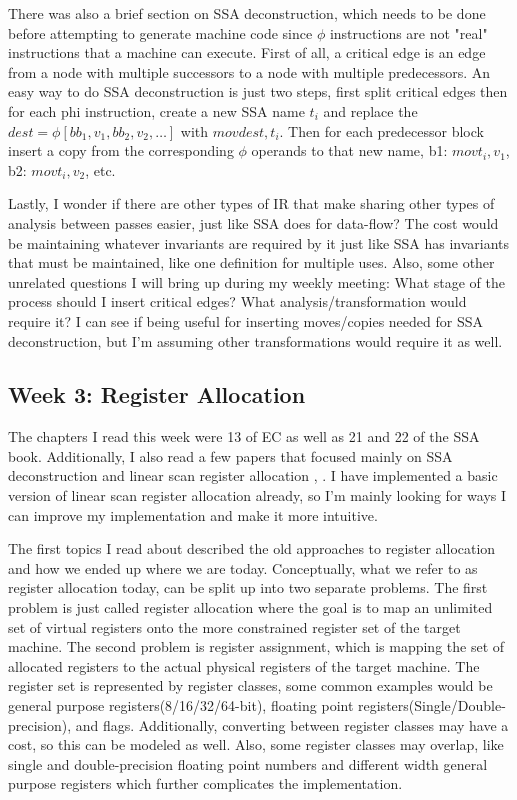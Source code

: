\documentclass[11pt, a4paper, titlepage]{article}
\begin{document}
There was also a brief section on SSA deconstruction, which needs to be done before attempting to generate machine code since $\phi$ instructions are not "real" instructions that a machine can execute.
First of all, a critical edge is an edge from a node with multiple successors to a node with multiple predecessors.
An easy way to do SSA deconstruction is just two steps, first split critical edges then for each phi instruction,
create a new SSA name $t_{i}$ and replace the $dest = \phi[{bb_{1},v_{1}}, {bb_{2},v_{2}}, \dots]$ with $mov dest, t_{i}$.
Then for each predecessor block insert a copy from the corresponding $\phi$ operands to that new name, b1: $mov t_{i}, v_{1}$, b2: $mov t_{i}, v_{2}$, etc.

Lastly, I wonder if there are other types of IR that make sharing other types of analysis between passes easier,
just like SSA does for data-flow?
The cost would be maintaining whatever invariants are required by it just like SSA has invariants that must be maintained,
like one definition for multiple uses.
Also, some other unrelated questions I will bring up during my weekly meeting:
What stage of the process should I insert critical edges?
What analysis/transformation would require it?
I can see if being useful for inserting moves/copies needed for SSA deconstruction, but I'm assuming other transformations would require it as well.

\subsection{Week 3: Register Allocation}

The chapters I read this week were 13 of EC as well as 21 and 22 of the SSA book.
Additionally, I also read a few papers that focused mainly on SSA deconstruction
\cite{ssadecon} and linear scan register allocation \cite{intervalsplitting}, \cite{lsrossa}.
I have implemented a basic version of linear scan register allocation already,
so I'm mainly looking for ways I can improve my implementation and make it more intuitive.

The first topics I read about described the old approaches to register allocation and how we ended up where we are today. Conceptually, what we refer to as register allocation today, can be split up into two separate problems. The first problem is just called register allocation where the goal is to map an unlimited set of virtual registers onto the more constrained register set of the target machine. The second problem is register assignment, which is mapping the set of allocated registers to the actual physical registers of the target machine. The register set is represented by register classes, some common examples would be general purpose registers(8/16/32/64-bit), floating point registers(Single/Double-precision), and flags. Additionally, converting between register classes may have a cost, so this can be modeled as well. Also, some register classes may overlap, like single and double-precision floating point numbers and different width general purpose registers which further complicates the implementation. 
\end{document}
